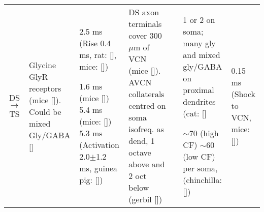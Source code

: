 \begin{longtable}{cYYYYYY}
DS\ensuremath{\rightarrow}TS                        
                                & %
Glycine GlyR receptors (mice []).
Could be mixed Gly/GABA [] 
                                & %
2.5 ms (Rise 0.4 ms, rat: [],
mice: [])


1.6 ms (mice [])
5.4 ms (mice: [])    
5.3 ms (Activation 2.0$\pm$1.2 ms, guinea pig: [])
                                & %
DS axon terminals cover 300 $\mu$m of VCN (mice []).
AVCN collaterals centred on soma isofreq. as dend, 1 octave above and 2 oct below (gerbil []) 
                                & %

                                & %
1 or 2 on soma; many gly and mixed gly/GABA on proximal dendrites (cat: [] 



$\sim$70 (high CF) $\sim$60 (low CF) per soma, 
(chinchilla: [])                

                                & 
0.15 ms (Shock to VCN, mice: [])


\end{longtable}
